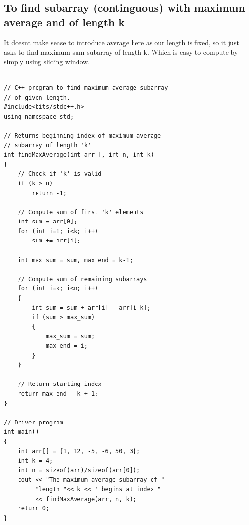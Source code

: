 \documentclass[8pt, a4paper, oneside, twocolumn]{extarticle}
\begin{document}
\subsection{To find subarray (continguous) with maximum average and of length k}
It doesnt make sense to introduce average here as our length is fixed, so it just asks to find maximum sum subarray of length k. Which is easy to compute by simply using sliding window.
\begin{verbatim}

// C++ program to find maximum average subarray 
// of given length. 
#include<bits/stdc++.h> 
using namespace std; 
  
// Returns beginning index of maximum average 
// subarray of length 'k' 
int findMaxAverage(int arr[], int n, int k) 
{ 
    // Check if 'k' is valid 
    if (k > n) 
        return -1; 
  
    // Compute sum of first 'k' elements 
    int sum = arr[0]; 
    for (int i=1; i<k; i++) 
        sum += arr[i]; 
  
    int max_sum = sum, max_end = k-1; 
  
    // Compute sum of remaining subarrays 
    for (int i=k; i<n; i++) 
    { 
        int sum = sum + arr[i] - arr[i-k]; 
        if (sum > max_sum) 
        { 
            max_sum = sum; 
            max_end = i; 
        } 
    } 
  
    // Return starting index 
    return max_end - k + 1; 
} 
  
// Driver program 
int main() 
{ 
    int arr[] = {1, 12, -5, -6, 50, 3}; 
    int k = 4; 
    int n = sizeof(arr)/sizeof(arr[0]); 
    cout << "The maximum average subarray of "
         "length "<< k << " begins at index "
         << findMaxAverage(arr, n, k); 
    return 0; 
} 
\end{verbatim}
\end{document}
